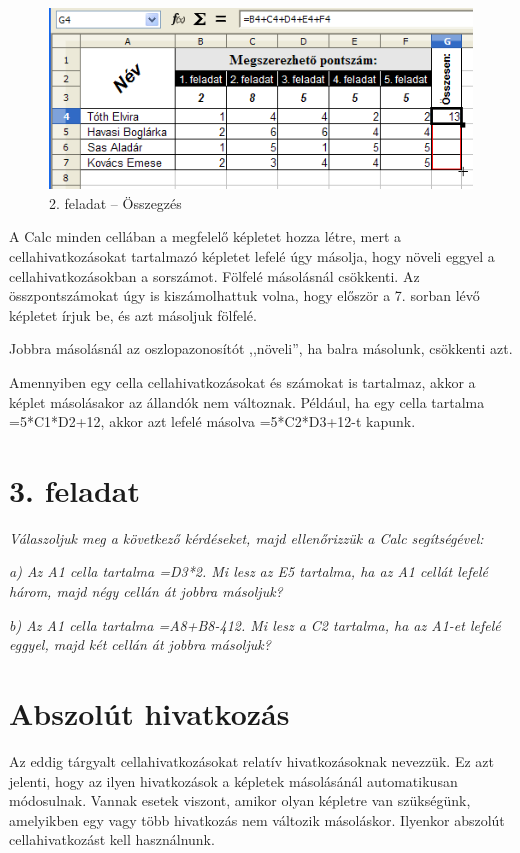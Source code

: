 \begin{figure}[!h]
\begin{center}
\includegraphics[width=12.122cm]{oocalcv2-img24.png}
\caption{2.  feladat --  Összegzés}\label{2-feladatÖsszegzés}
\end{center}
\end{figure}

A Calc minden cellában a megfelelő képletet hozza létre, mert
a cellahivatkozásokat tartalmazó képletet lefelé úgy
másolja, hogy növeli eggyel a cellahivatkozásokban a sorszámot.
Fölfelé másolásnál csökkenti. Az összpontszámokat úgy
is kiszámolhattuk volna, hogy először a 7. sorban lévő
képletet írjuk be, és azt másoljuk fölfelé.

Jobbra másolásnál az oszlopazonosítót ,,növeli'', ha balra másolunk,
csökkenti azt.

Amennyiben egy cella cellahivatkozásokat és számokat is tartalmaz,
akkor a képlet másolásakor az állandók nem változnak.
Például, ha egy cella tartalma =5*C1*D2+12, akkor azt lefelé
másolva   =5*C2*D3+12-t kapunk.

\clearpage
\section{3. feladat}
{\itshape
Válaszoljuk meg a következő kérdéseket, majd
ellenőrizzük a Calc segítségével:}

{\itshape
a) Az A1 cella tartalma =D3*2. Mi lesz az E5 tartalma, ha az A1 cellát
lefelé három, majd négy cellán át jobbra másoljuk?}

{\itshape
b) Az A1 cella tartalma =A8+B8-412. Mi lesz a C2 tartalma, ha az A1-et
lefelé eggyel, majd két cellán át jobbra másoljuk?}


\section{Abszolút hivatkozás}

Az eddig tárgyalt cellahivatkozásokat relatív hivatkozásoknak
nevezzük. Ez azt jelenti, hogy az ilyen hivatkozások a képletek
másolásánál automatikusan módosulnak. Vannak esetek viszont,
amikor olyan képletre van szükségünk, amelyikben egy vagy
több hivatkozás nem változik másoláskor. Ilyenkor abszolút
cellahivatkozást kell használnunk.

